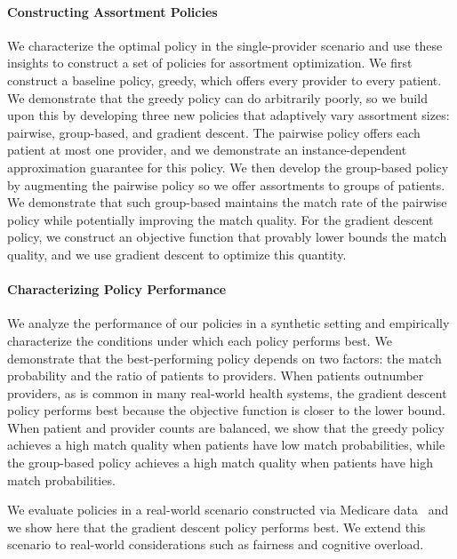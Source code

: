 \paragraph{Constructing Assortment Policies}
We characterize the optimal policy in the single-provider scenario and use these insights to construct a set of policies for assortment optimization. 
We first construct a baseline policy, greedy, which offers every provider to every patient. 
We demonstrate that the greedy policy can do arbitrarily poorly, so we build upon this by developing three new policies that adaptively vary assortment sizes: pairwise, group-based, and gradient descent.
The pairwise policy offers each patient at most one provider, and we demonstrate an instance-dependent approximation guarantee for this policy. 
We then develop the group-based policy by augmenting the pairwise policy so we offer assortments to groups of patients. 
We demonstrate that such group-based maintains the match rate of the pairwise policy while potentially improving the match quality. 
For the gradient descent policy, we construct an objective function that provably lower bounds the match quality, and we use gradient descent to optimize this quantity. 

\paragraph{Characterizing Policy Performance}
We analyze the performance of our policies in a synthetic setting and empirically characterize the conditions under which each policy performs best. 
We demonstrate that the best-performing policy depends on two factors: the match probability and the ratio of patients to providers. 
When patients outnumber providers, as is common in many real-world health systems, the gradient descent policy performs best because the objective function is closer to the lower bound. 
When patient and provider counts are balanced, we show that the greedy policy achieves a high match quality when patients have low match probabilities, while the group-based policy achieves a high match quality when patients have high match probabilities. 

We evaluate policies in a real-world scenario constructed via Medicare data~\citep{Medicare} and we show here that the gradient descent policy performs best. 
We extend this scenario to real-world considerations such as fairness and cognitive overload. 

